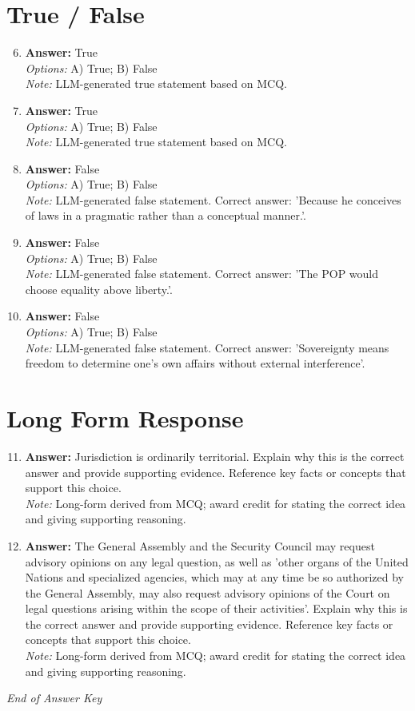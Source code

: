 \documentclass[12pt]{article}
\begin{document}
\section*{True / False}
\begin{enumerate}[label=\arabic*.]
\setcounter{enumi}{5}
\item \textbf{Answer:} True
\\ \textit{Options:} A) True; B) False
\\ \textit{Note:} LLM-generated true statement based on MCQ.
\item \textbf{Answer:} True
\\ \textit{Options:} A) True; B) False
\\ \textit{Note:} LLM-generated true statement based on MCQ.
\item \textbf{Answer:} False
\\ \textit{Options:} A) True; B) False
\\ \textit{Note:} LLM-generated false statement. Correct answer: 'Because he conceives of laws in a pragmatic rather than a conceptual manner.'.
\item \textbf{Answer:} False
\\ \textit{Options:} A) True; B) False
\\ \textit{Note:} LLM-generated false statement. Correct answer: 'The POP would choose equality above liberty.'.
\item \textbf{Answer:} False
\\ \textit{Options:} A) True; B) False
\\ \textit{Note:} LLM-generated false statement. Correct answer: 'Sovereignty means freedom to determine one's own affairs without external interference'.
\end{enumerate}

\section*{Long Form Response}
\begin{enumerate}[label=\arabic*.]
\setcounter{enumi}{10}
\item \textbf{Answer:} Jurisdiction is ordinarily territorial. Explain why this is the correct answer and provide supporting evidence. Reference key facts or concepts that support this choice.
\\ \textit{Note:} Long-form derived from MCQ; award credit for stating the correct idea and giving supporting reasoning.
\item \textbf{Answer:} The General Assembly and the Security Council may request advisory opinions on any legal question, as well as 'other organs of the United Nations and specialized agencies, which may at any time be so authorized by the General Assembly, may also request advisory opinions of the Court on legal questions arising within the scope of their activities'. Explain why this is the correct answer and provide supporting evidence. Reference key facts or concepts that support this choice.
\\ \textit{Note:} Long-form derived from MCQ; award credit for stating the correct idea and giving supporting reasoning.
\end{enumerate}

\vfill
\noindent\textit{End of Answer Key}
\end{document}
